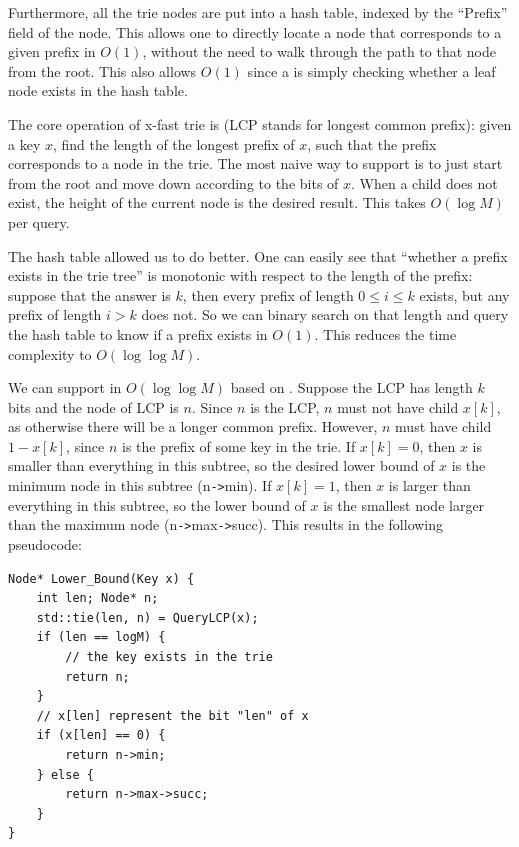 \documentclass[11pt, usletter]{article}
\begin{document}
Furthermore, all the trie nodes are put into a hash table, indexed by the ``Prefix'' field of the node. 
This allows one to directly locate a node that corresponds to a given prefix in $O(1)$, without the need to walk through the path 
to that node from the root. This also allows $O(1)$ \lookup 
since a \lookup is simply checking whether a leaf node exists in the hash table.

The core operation of x-fast trie is \QueryLCP (LCP stands for longest common prefix): 
given a key $x$, find the length of the longest prefix of $x$, 
such that the prefix corresponds to a node in the trie. The most naive way to support \QueryLCP is to just 
start from the root and move down according to the bits of $x$. When a child does not exist, 
the height of the current node is the desired result. This takes $O(\log M)$ per query.

The hash table allowed us to do better. One can easily see that ``whether a prefix exists in the trie tree'' 
is monotonic with respect to the length of the prefix: suppose that the answer is $k$, 
then every prefix of length $0\leq i\leq k$ exists, but any prefix of length $i>k$ does not. 
So we can binary search on that length and query the hash table to know if a prefix exists in $O(1)$. 
This reduces the time complexity to $O(\log\log M)$. 

We can support \lowerbound in $O(\log\log M)$ based on \QueryLCP. 
Suppose the LCP has length $k$ bits and the node of LCP is $n$. 
Since $n$ is the LCP, $n$ must not have child $x[k]$, as otherwise there will be a longer common prefix. 
However, $n$ must have child $1-x[k]$, since $n$ is the prefix of some key in the trie. 
If $x[k]=0$, then $x$ is smaller than everything in this subtree, 
so the desired lower bound of $x$ is the minimum node in this subtree (n\verb|->|min). 
If $x[k]=1$, then $x$ is larger than everything in this subtree, 
so the lower bound of $x$ is the smallest node larger than the maximum node (n\verb|->|max\verb|->|succ). 
This results in the following pseudocode:

\singlespacing\begin{codebox}
\begin{verbatim}
Node* Lower_Bound(Key x) {
    int len; Node* n;
    std::tie(len, n) = QueryLCP(x);
    if (len == logM) {
        // the key exists in the trie
        return n;
    }
    // x[len] represent the bit "len" of x
    if (x[len] == 0) {
        return n->min;
    } else {
        return n->max->succ;
    }
}
\end{verbatim}
\end{codebox}\doublespacing
\end{document}
